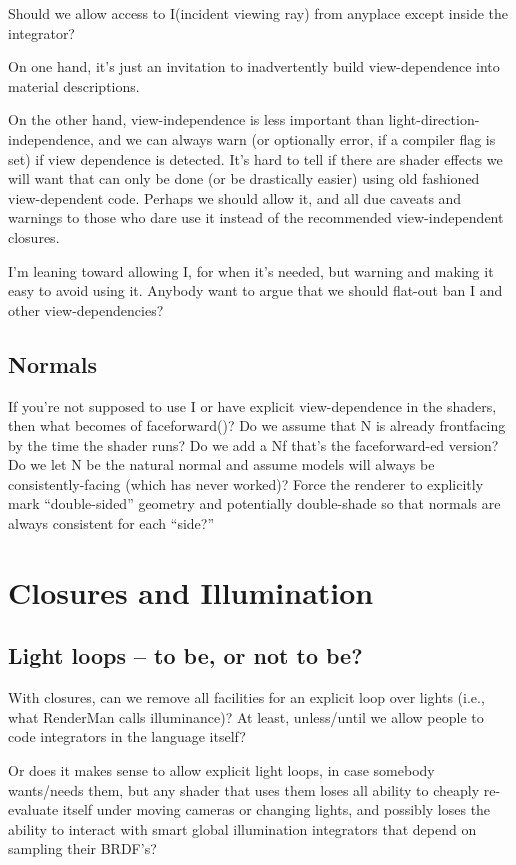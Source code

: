 \documentclass[11pt,letterpaper]{book}
\def\I{{\cf I}\xspace}
\def\N{{\cf N}\xspace}
\begin{document}
\begin{annotate}
Should we allow access to \I (incident viewing ray) from anyplace except
inside the integrator?  

On one hand, it's just an invitation to inadvertently build
view-dependence into material descriptions.

On the other hand, view-independence is less important than
light-direction-independence, and we can always warn (or optionally
error, if a compiler flag is set) if view dependence is detected.  It's
hard to tell if there are shader effects we will want that can only be
done (or be drastically easier) using old fashioned view-dependent code.
Perhaps we should allow it, and all due caveats and warnings to those
who dare use it instead of the recommended view-independent closures.

I'm leaning toward allowing \I, for when it's needed, but warning and
making it easy to avoid using it.  Anybody want to argue that we should
flat-out ban \I and other view-dependencies?

\subsection{Normals}

If you're not supposed to use \I or have explicit view-dependence in the
shaders, then what becomes of {\cf faceforward()}?  Do we assume that \N
is already frontfacing by the time the shader runs?  Do we add a {\cf
  Nf} that's the faceforward-ed version?  Do we let \N be the natural
normal and assume models will always be consistently-facing (which has
never worked)?  Force the renderer to explicitly mark ``double-sided''
geometry and potentially double-shade so that normals are always
consistent for each ``side?''

\section{Closures and Illumination}

\subsection{Light loops -- to be, or not to be?}

With closures, can we remove all facilities for an explicit loop over
lights (i.e., what RenderMan calls {\cf illuminance})?  At least, 
unless/until we allow people to code integrators in the language itself?

Or does it makes sense to allow explicit light loops, in case somebody
wants/needs them, but any shader that uses them loses all ability to
cheaply re-evaluate itself under moving cameras or changing lights, and
possibly loses the ability to interact with smart global illumination
integrators that depend on sampling their BRDF's?


\end{annotate}
\end{document}
